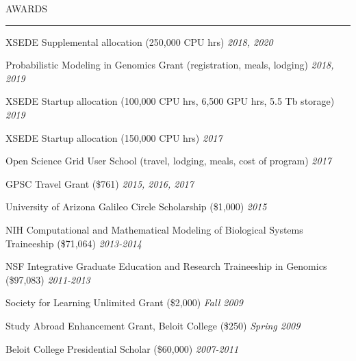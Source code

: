\documentclass{resume} %
\renewenvironment{rSection}[1]{
\sectionskip
\textcolor{RoyalPurple}{\MakeUppercase{#1}}
\sectionlineskip
\hrule
\begin{list}{}{
\setlength{\leftmargin}{1.5em}
}
\item[]
}{
\end{list}
}
\begin{document}
\begin{rSection}{Awards}

\item XSEDE Supplemental allocation (250,000 CPU hrs) \hfill{\em 2018, 2020}
\item Probabilistic Modeling in Genomics Grant (registration, meals, lodging) \hfill{\em 2018, 2019}
\item XSEDE Startup allocation (100,000 CPU hrs, 6,500 GPU hrs, 5.5 Tb storage) \hfill{\em 2019}
\item XSEDE Startup allocation (150,000 CPU hrs) \hfill{\em 2017}
\item Open Science Grid User School (travel, lodging, meals, cost of program) \hfill{\em 2017}
\item GPSC Travel Grant (\$761) \hfill{\em 2015, 2016, 2017} 
\item University of Arizona Galileo Circle Scholarship (\$1,000) \hfill{\em 2015} 
\item NIH Computational and Mathematical Modeling of Biological Systems Traineeship (\$71,064) \hfill {\em 2013-2014}
\item NSF Integrative Graduate Education and Research Traineeship in Genomics (\$97,083) \hfill {\em 2011-2013}
\item Society for Learning Unlimited Grant (\$2,000) \hfill {\em Fall 2009}
\item Study Abroad Enhancement Grant, Beloit College (\$250) \hfill {\em Spring 2009}
\item Beloit College Presidential Scholar (\$60,000) \hfill {\em 2007-2011}

\end{rSection}

\end{document}
